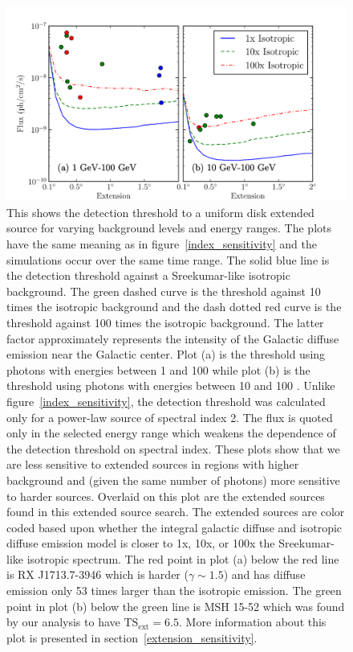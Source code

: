 \documentclass[12pt,preprint]{aastex}
\newcommand{\gev}{\text{GeV}\xspace}
\newcommand{\tsext}{{\ensuremath{\text{TS}_{\text{ext}}}}\xspace}
\renewcommand{\approx}{\sim\!\xspace}
\begin{document}
\clearpage

\begin{figure}
  \begin{center}
    \includegraphics{mc_plots/diff_factor_sensitivity.pdf}
    \end{center}
    \caption{
    This shows the detection threshold to a uniform disk extended
    source for varying background levels
    and energy ranges.  The plots have the same meaning as in
    figure~\ref{index_sensitivity} and the simulations occur over the
    same time range.  The solid blue line is the detection threshold against a
    Sreekumar-like isotropic background. The green dashed curve is the
    threshold against 10 times the isotropic background and the dash
    dotted red curve is the threshold against 100 times the isotropic
    background.  The latter factor approximately represents the intensity
    of the Galactic diffuse emission near the Galactic center.  Plot (a)
    is the threshold using photons with energies between 1 \gev and 100
    \gev while plot (b) is the threshold using photons with energies
    between 10 \gev and 100 \gev. Unlike figure~\ref{index_sensitivity},
    the detection threshold was calculated only for a power-law source of spectral
    index 2. The flux is quoted only in the selected energy range which
    weakens the dependence of the detection threshold on spectral index.
    These plots show that we are less sensitive to extended sources in
    regions with higher background and (given the same number of photons)
    more sensitive to harder sources.  Overlaid on this plot are the
    extended sources found in this extended source search. The extended
    sources are color coded based upon whether the integral galactic
    diffuse and isotropic diffuse emission model is closer to 1x, 10x,
    or 100x the Sreekumar-like isotropic spectrum.  The red point
    in plot (a) below the red line is RX J1713.7-3946 which is harder
    ($\gamma\approx1.5$) and has diffuse emission only 53 times larger
    than the isotropic emission.  The green point in plot (b) below
    the green line is MSH 15-52 which was found by our analysis to
    have $\tsext=6.5$.  More information about this plot is presented
    in section~\ref{extension_sensitivity}.
    }\label{diff_factor_sensitivity}
  \end{figure}
\end{document}
